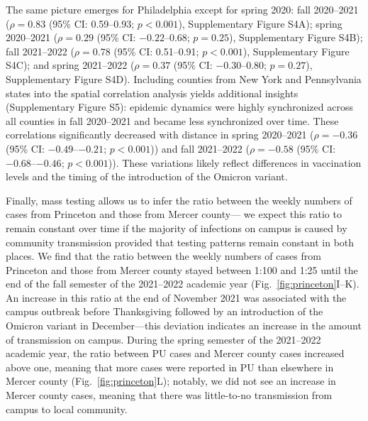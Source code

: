 \documentclass[12pt]{article}
\newcommand{\fref}[1]{Fig.~\ref{fig:#1}}
\begin{document}
The same picture emerges for Philadelphia except for spring 2020: fall 2020--2021 ($\rho = 0.83$ (95\% CI: 0.59--0.93; $p < 0.001$), Supplementary Figure S4A); spring 2020--2021 ($\rho = 0.29$ (95\% CI: $-0.22$--0.68; $p = 0.25$), Supplementary Figure S4B); fall 2021--2022 ($\rho = 0.78$ (95\% CI: 0.51--0.91; $p < 0.001$), Supplementary Figure S4C); 
and spring 2021--2022 ($\rho=0.37$ (95\% CI: $-0.30$--0.80; $p=0.27$), Supplementary Figure S4D).
Including counties from New York and Pennsylvania states into the spatial correlation analysis yields additional insights (Supplementary Figure S5):
epidemic dynamics were highly synchronized across all counties in fall 2020--2021 and became less synchronized over time. 
These correlations significantly decreased with distance in spring 2020--2021 ($\rho = -0.36$ (95\% CI: $-0.49$--$-0.21$; $p < 0.001$)) and fall 2021--2022 ($\rho = -0.58$ (95\% CI: $-0.68$--$-0.46$; $p < 0.001$)).
These variations likely reflect differences in vaccination levels and the timing of the introduction of the Omicron variant.

Finally, mass testing allows us to infer the ratio between the weekly numbers of cases from Princeton and those from Mercer county---
we expect this ratio to remain constant over time if the majority of infections on campus is caused by community transmission provided that testing patterns remain constant in both places.
We find that the ratio between the weekly numbers of cases from Princeton and those from Mercer county stayed between 1:100 and 1:25 until the end of the fall semester of the 2021--2022 academic year (\fref{princeton}I--K).
An increase in this ratio at the end of November 2021 was associated with the campus outbreak before Thanksgiving followed by an introduction of the Omicron variant in December---this deviation indicates an increase in the amount of transmission on campus.
During the spring semester of the 2021--2022 academic year, the ratio between PU cases and Mercer county cases increased above one, meaning that more cases were reported in PU than elsewhere in Mercer county (\fref{princeton}L);
notably, we did not see an increase in Mercer county cases, meaning that there was little-to-no transmission from campus to local community.
\end{document}
